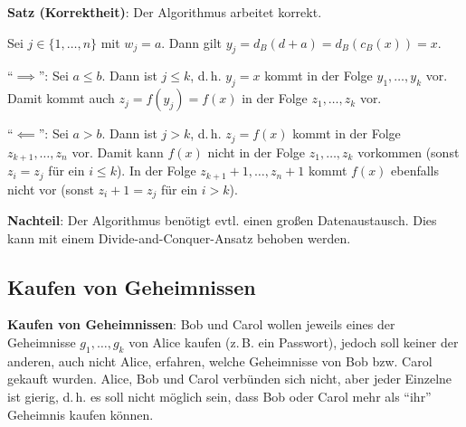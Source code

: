 \linie

\textbf{Satz (Korrektheit)}:
Der Algorithmus arbeitet korrekt.

\begin{Beweis}
    Sei $j \in \{1, \dotsc, n\}$ mit $w_j = a$.
    Dann gilt $y_j = d_B(d + a) = d_B(c_B(x)) = x$.

    "`$\implies$"':
    Sei $a \le b$.
    Dann ist $j \le k$, d.\,h. $y_j = x$ kommt in der Folge $y_1, \dotsc, y_k$ vor.
    Damit kommt auch $z_j = f(y_j) = f(x)$ in der Folge $z_1, \dotsc, z_k$ vor.

    "`$\impliedby$"':
    Sei $a > b$.
    Dann ist $j > k$, d.\,h. $z_j = f(x)$ kommt in der Folge $z_{k+1}, \dotsc, z_n$ vor.
    Damit kann $f(x)$ nicht in der Folge $z_1, \dotsc, z_k$ vorkommen
    (sonst $z_i = z_j$ für ein $i \le k$).
    In der Folge $z_{k+1} + 1, \dotsc, z_n + 1$ kommt $f(x)$ ebenfalls nicht vor
    (sonst $z_i + 1 = z_j$ für ein $i > k$).
\end{Beweis}

\linie

\textbf{Nachteil}:
Der Algorithmus benötigt evtl. einen großen Datenaustausch.
Dies kann mit einem Divide-and-Conquer-Ansatz behoben werden.

\pagebreak

\subsection{%
    Kaufen von Geheimnissen%
}

\textbf{Kaufen von Geheimnissen}:
Bob und Carol wollen jeweils eines der Geheimnisse $g_1, \dotsc, g_k$ von Alice kaufen
(z.\,B. ein Passwort),
jedoch soll keiner der anderen, auch nicht Alice, erfahren, welche Geheimnisse von
Bob bzw. Carol gekauft wurden.
Alice, Bob und Carol verbünden sich nicht,
aber jeder Einzelne ist gierig, d.\,h. es soll nicht möglich sein, dass Bob oder Carol mehr
als "`ihr"' Geheimnis kaufen können.

